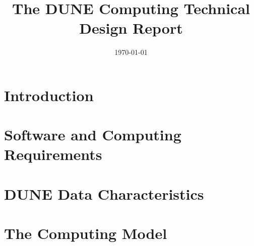 \documentclass[12pt]{article}
\begin{document}

\title{The DUNE Computing Technical Design Report}

\date{\today}


\maketitle





\newpage
%

\newpage
\tableofcontents

\newpage
\section{Introduction}


\newpage
\section{Software and Computing Requirements}


\newpage
\section{DUNE Data Characteristics}


\newpage
\section{The Computing Model}



\newpage

\end{document}
